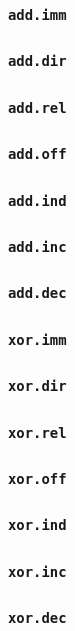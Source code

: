 \subsubsection{\texttt{add.imm}}
\subsubsection{\texttt{add.dir}}
\subsubsection{\texttt{add.rel}}
\subsubsection{\texttt{add.off}}
\subsubsection{\texttt{add.ind}}
\subsubsection{\texttt{add.inc}}
\subsubsection{\texttt{add.dec}}

\subsubsection{\texttt{xor.imm}}
\subsubsection{\texttt{xor.dir}}
\subsubsection{\texttt{xor.rel}}
\subsubsection{\texttt{xor.off}}
\subsubsection{\texttt{xor.ind}}
\subsubsection{\texttt{xor.inc}}
\subsubsection{\texttt{xor.dec}}
